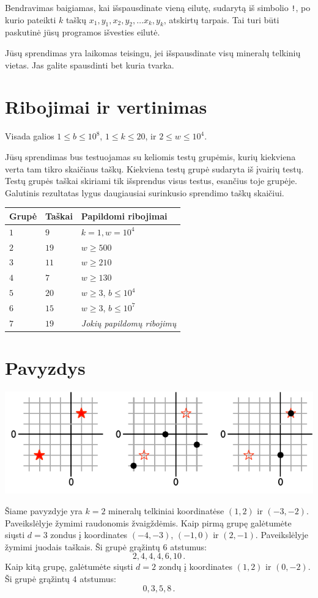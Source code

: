 Bendravimas baigiamas, kai išspausdinate vieną eilutę, sudarytą iš simbolio \texttt{!}, po kurio pateikti
$k$ taškų \newline $x_1, y_1, x_2, y_2, \ldots x_k, y_k$, atskirtų tarpais.
Tai turi būti paskutinė jūsų programos išvesties eilutė.

Jūsų sprendimas yra laikomas teisingu, jei išspausdinate visų mineralų telkinių vietas. 
Jas galite spausdinti bet kuria tvarka.

\section*{Ribojimai ir vertinimas}

Visada galios
$1\leq b \leq 10^8$, %
$1 \leq k \leq 20$, %
ir
$2 \le w \le 10^4$. %

Jūsų sprendimas bus testuojamas su keliomis testų grupėmis, kurių kiekviena verta tam tikro skaičiaus taškų.
Kiekviena testų grupė sudaryta iš įvairių testų.
Testų grupės taškai skiriami tik išsprendus visus testus, esančius toje grupėje.
Galutinis rezultatas lygus daugiausiai surinkusio sprendimo taškų skaičiui.

\medskip
\begin{tabular}{lll}
Grupė & Taškai & Papildomi ribojimai \\\hline
  $1$ & $9$ & $k = 1, w = 10^4$\\
  $2$ & $19$ & $w \ge 500$\\
  $3$ & $11$ & $w \ge 210$\\
  $4$ & $7$ & $w \ge 130$\\
  $5$ & $20$ & $w \ge 3$, $b \le 10^4$\\
  $6$ & $15$ & $w \ge 3$, $b \le 10^7$\\
  $7$ & $19$ & \emph{Jokių papildomų ribojimų}
\end{tabular}

\section*{Pavyzdys}

\includegraphics[width=.6\textwidth]{img/sample1.pdf}

Šiame pavyzdyje yra $k=2$ mineralų telkiniai koordinatėse $(1,2)$ ir $(-3,-2)$. Paveikslėlyje žymimi raudonomis žvaigždėmis.
Kaip pirmą grupę galėtumėte siųsti $d=3$ zondus į koordinates $(-4,-3)$, $(-1, 0)$ ir $(2,-1)$. Paveikslėlyje žymimi juodais taškais.
Ši grupė grąžintų $6$ atstumus: \[
  2, 4, 4, 4, 6, 10\,.
\]
Kaip kitą grupę, galėtumėte siųsti $d=2$ zondų į koordinates $(1,2)$ ir $(0,-2)$.
Ši grupė grąžintų $4$ atstumus: \[
  0, 3, 5, 8\,.
\]
